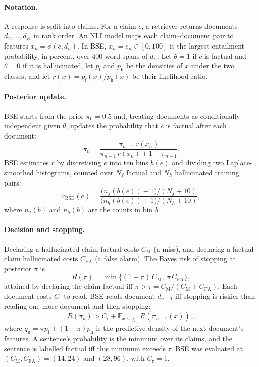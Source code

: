\documentclass[11pt]{article}
\newcommand{\E}{\mathbb{E}}
\newcommand{\CM}{C_{\mathrm{M}}}
\newcommand{\CFA}{C_{\mathrm{FA}}}
\newcommand{\Cr}{C_{\mathrm{r}}}
\newcommand{\pf}{p_{\mathrm{f}}}
\newcommand{\ph}{p_{\mathrm{h}}}
\begin{document}
\paragraph{Notation.} A response is split into claims. For a claim $c$, a
retriever returns documents $d_1, \dots, d_K$ in rank order. An NLI model maps
each claim--document pair to features $x_n = \phi(c, d_n)$. In BSE,
$x_n = e_n \in [0, 100]$ is the largest entailment probability, in percent,
over 400-word spans of $d_n$. Let $\theta = 1$ if $c$ is factual and
$\theta = 0$ if it is hallucinated, let $\pf$ and $\ph$ be the densities of
$x$ under the two classes, and let $r(x) = \pf(x)/\ph(x)$ be their likelihood
ratio.

\paragraph{Posterior update.} BSE starts from the prior $\pi_0 = 0.5$ and,
treating documents as conditionally independent given $\theta$, updates the
probability that $c$ is factual after each document:
\begin{equation}
\pi_n = \frac{\pi_{n-1}\, r(x_n)}{\pi_{n-1}\, r(x_n) + 1 - \pi_{n-1}}.
\label{eq:update}
\end{equation}
BSE estimates $r$ by discretising $e$ into ten bins $b(e)$ and dividing two
Laplace-smoothed histograms, counted over $N_f$ factual and $N_h$
hallucinated training pairs:
\begin{equation}
r_{\mathrm{BSE}}(e) = \frac{\bigl(n_f(b(e)) + 1\bigr) / (N_f + 10)}
                           {\bigl(n_h(b(e)) + 1\bigr) / (N_h + 10)},
\label{eq:bse-ratio}
\end{equation}
where $n_f(b)$ and $n_h(b)$ are the counts in bin $b$.

\paragraph{Decision and stopping.} Declaring a hallucinated claim factual
costs $\CM$ (a miss), and declaring a factual claim hallucinated costs $\CFA$
(a false alarm). The Bayes risk of stopping at posterior $\pi$ is
\begin{equation}
R(\pi) = \min\bigl\{(1 - \pi)\,\CM,\ \pi\, \CFA\bigr\},
\label{eq:risk}
\end{equation}
attained by declaring the claim factual iff $\pi > \tau = \CM / (\CM + \CFA)$.
Each document costs $\Cr$ to read. BSE reads document $d_{n+1}$ iff stopping
is riskier than reading one more document and then stopping:
\begin{equation}
R(\pi_n) > \Cr + \E_{x \sim q_{\pi_n}}\bigl[R(\pi_{n+1}(x))\bigr],
\label{eq:onestep}
\end{equation}
where $q_\pi = \pi \pf + (1 - \pi) \ph$ is the predictive density of the next
document's features. A sentence's probability is the minimum over its claims,
and the sentence is labelled factual iff this minimum exceeds $\tau$. BSE was
evaluated at $(\CM, \CFA) = (14, 24)$ and $(28, 96)$, with $\Cr = 1$.
\end{document}
